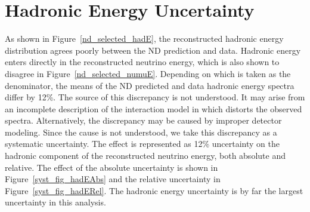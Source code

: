 {\begin{figure}
\end{figure}

\clearpage
\section{Hadronic Energy Uncertainty}

As shown in Figure~\ref{nd_selected_hadE}, the reconstructed hadronic
energy distribution agrees poorly between the ND prediction and data.
Hadronic energy enters directly in the reconstructed neutrino energy,
which is also shown to disagree in Figure~\ref{nd_selected_numuE}.
Depending on which is taken as the denominator,
the means of the ND predicted and data hadronic energy spectra
differ by 12\%.
The source of this discrepancy is not understood.
It may arise from an incomplete description of the interaction model
in \genie which distorts the observed spectra.
Alternatively, the discrepancy may be caused by improper detector modeling.
Since the cause is not understood, we take this discrepancy as a
systematic uncertainty.
The effect is represented as 12\% uncertainty on the hadronic
component of the reconstructed neutrino energy, both absolute and relative.
The effect of the absolute uncertainty is shown in
Figure~\ref{syst_fig_hadEAbs} and the relative uncertainty in
Figure~\ref{syst_fig_hadERel}.
The hadronic energy uncertainty is by far the largest uncertainty in this
analysis.

}
